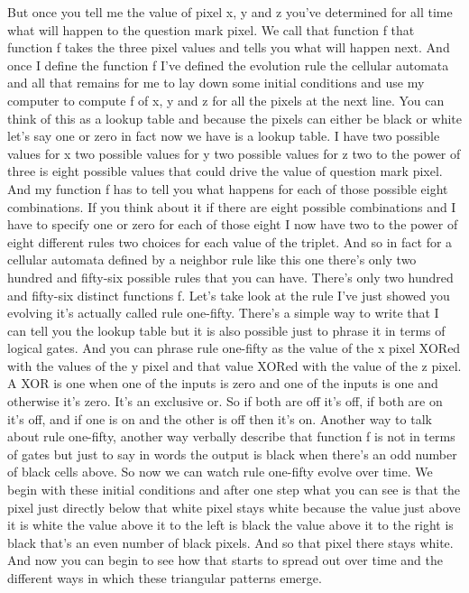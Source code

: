 \documentclass[]{article}
\begin{document}
But once you tell me
the value of pixel x, y and z
you've determined
for all time
what will happen
to the question mark pixel.
We call that function f
that function f takes
the three pixel values
and tells you
what will happen next.
And once I define the function f
I've defined the evolution rule
the cellular automata
and all that remains for me
to lay down some initial conditions
and use my computer
to compute f of x, y and z
for all the pixels
at the next line.
You can think of this as a lookup table
and because the pixels can either be
black or white
let's say one or zero
in fact now
we have is a lookup table.
I have two possible values for x
two possible values for y
two possible values for z
two to the power of three is eight
possible values
that could drive the value of
question mark pixel.
And my function f
has to tell you what happens
for each of those possible
eight combinations.
If you think about it
if there are eight possible combinations
and I have to specify one or zero
for each of those eight
I now have two to the power of eight
different rules
two choices for each value of the triplet.
And so in fact
for a cellular automata
defined by a neighbor rule
like this one
there's only two hundred
and fifty-six possible rules
that you can have.
There's only two hundred and fifty-six
distinct
functions f.
Let's take look at the rule
I've just showed you evolving
it's actually called rule one-fifty.
There's a simple way to write
that I can tell you
the lookup table
but it is also possible
just to phrase it in terms
of logical gates.
And you can phrase rule one-fifty
as the value
of the x pixel XORed
with the values of the y pixel
and that value XORed
with the value of the z pixel.
A XOR is one
when one of the inputs is zero
and one of the inputs is one
and otherwise it's zero.
It's an exclusive or.
So if both are off
it's off,
if both are on
it's off,
and if one is on and the other is off
then it's on.
Another way to talk about rule one-fifty,
another way verbally describe
that function f
is not in terms of gates
but just to say
in words
the output is black
when there's an odd number
of black cells
above.
So now we can watch
rule one-fifty
evolve
over time.
We begin with these initial conditions
and after one step
what you can see
is that the pixel
just directly below
that white pixel
stays white
because the value just above it is white
the value above it to the left is black
the value above it to the right is black
that's an even number of black pixels.
And so that pixel there stays white.
And now you can begin to see
how that
starts to spread out
over time
and the different ways
in which
these triangular
patterns
emerge.
\end{document}
